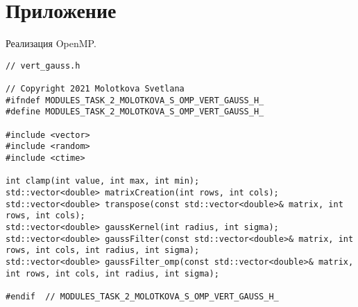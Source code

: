 \documentclass{report}
\begin{document}
\section*{Приложение}
Реализация OpenMP.
\begin{lstlisting}
// vert_gauss.h

// Copyright 2021 Molotkova Svetlana
#ifndef MODULES_TASK_2_MOLOTKOVA_S_OMP_VERT_GAUSS_H_
#define MODULES_TASK_2_MOLOTKOVA_S_OMP_VERT_GAUSS_H_

#include <vector>
#include <random>
#include <ctime>

int clamp(int value, int max, int min);
std::vector<double> matrixCreation(int rows, int cols);
std::vector<double> transpose(const std::vector<double>& matrix, int rows, int cols);
std::vector<double> gaussKernel(int radius, int sigma);
std::vector<double> gaussFilter(const std::vector<double>& matrix, int rows, int cols, int radius, int sigma);
std::vector<double> gaussFilter_omp(const std::vector<double>& matrix, int rows, int cols, int radius, int sigma);

#endif  // MODULES_TASK_2_MOLOTKOVA_S_OMP_VERT_GAUSS_H_

\end{lstlisting}
\end{document}
